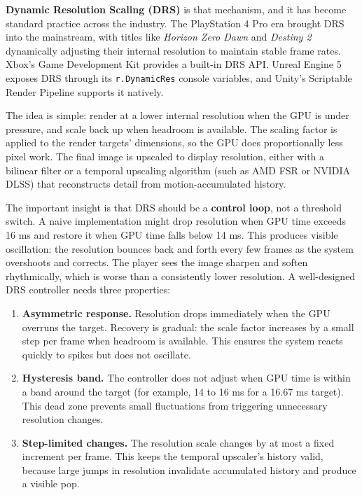 \documentclass[
  11pt,
  letterpaper,
  DIV=11,
  numbers=noendperiod,
  twoside,
  open=right]{scrreprt}
\begin{document}
\textbf{Dynamic Resolution Scaling (DRS)} is that mechanism, and it has
become standard practice across the industry. The PlayStation 4 Pro era
brought DRS into the mainstream, with titles like \emph{Horizon Zero
Dawn} and \emph{Destiny 2} dynamically adjusting their internal
resolution to maintain stable frame rates. Xbox's Game Development Kit
provides a built-in DRS API. Unreal Engine 5 exposes DRS through its
\texttt{r.DynamicRes} console variables, and Unity's Scriptable Render
Pipeline supports it natively.

The idea is simple: render at a lower internal resolution when the GPU
is under pressure, and scale back up when headroom is available. The
scaling factor is applied to the render targets' dimensions, so the GPU
does proportionally less pixel work. The final image is upscaled to
display resolution, either with a bilinear filter or a temporal
upscaling algorithm (such as AMD FSR or NVIDIA DLSS) that reconstructs
detail from motion-accumulated history.

The important insight is that DRS should be a \textbf{control loop}, not
a threshold switch. A naive implementation might drop resolution when
GPU time exceeds 16 ms and restore it when GPU time falls below 14 ms.
This produces visible oscillation: the resolution bounces back and forth
every few frames as the system overshoots and corrects. The player sees
the image sharpen and soften rhythmically, which is worse than a
consistently lower resolution. A well-designed DRS controller needs
three properties:

\begin{enumerate}
\def\labelenumi{\arabic{enumi}.}
\item
  \textbf{Asymmetric response.} Resolution drops immediately when the
  GPU overruns the target. Recovery is gradual: the scale factor
  increases by a small step per frame when headroom is available. This
  ensures the system reacts quickly to spikes but does not oscillate.
\item
  \textbf{Hysteresis band.} The controller does not adjust when GPU time
  is within a band around the target (for example, 14 to 16 ms for a
  16.67 ms target). This dead zone prevents small fluctuations from
  triggering unnecessary resolution changes.
\item
  \textbf{Step-limited changes.} The resolution scale changes by at most
  a fixed increment per frame. This keeps the temporal upscaler's
  history valid, because large jumps in resolution invalidate
  accumulated history and produce a visible pop.
\end{enumerate}
\end{document}
